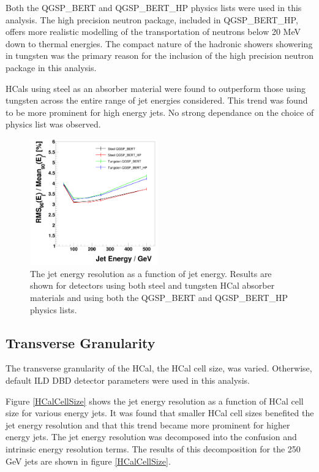 \documentclass[final,3p,times,twocolumn]{elsarticle}
\begin{document}
Both the QGSP\_BERT and QGSP\_BERT\_HP physics lists were used in this analysis.  The high precision neutron package, included in QGSP\_BERT\_HP, offers more realistic modelling of the transportation of neutrons below 20 MeV down to thermal energies.  The compact nature of the hadronic showers showering in tungsten was the primary reason for the inclusion of the high precision neutron package in this analysis.

HCals using steel as an absorber material were found to outperform those using tungsten across the entire range of jet energies considered.  This trend was found to be more prominent for high energy jets.  No strong dependance on the choice of physics list was observed.

\begin{figure}[!h]
  \begin{center}
     \includegraphics[width=0.49\textwidth]{JERvsJetEnergy_HCalMaterialHCalTC10ns.png}
     \caption{The jet energy resolution as a function of jet energy.  Results are shown for detectors using both steel and tungsten HCal absorber materials and using both the QGSP\_BERT and QGSP\_BERT\_HP physics lists.  \label{}}
  \end{center}
\end{figure}

\subsection{Transverse Granularity}
The transverse granularity of the HCal, the HCal cell size, was varied.  Otherwise, default ILD DBD detector parameters were used in this analysis.

Figure \ref{HCalCellSize} shows the jet energy resolution as a function of HCal cell size for various energy jets.  It was found that smaller HCal cell sizes benefited the jet energy resolution and that this trend became more prominent for higher energy jets.  The jet energy resolution was decomposed into the confusion and intrinsic energy resolution terms.  The results of this decomposition for the 250 GeV jets are shown in figure \ref{HCalCellSize}.
\end{document}
